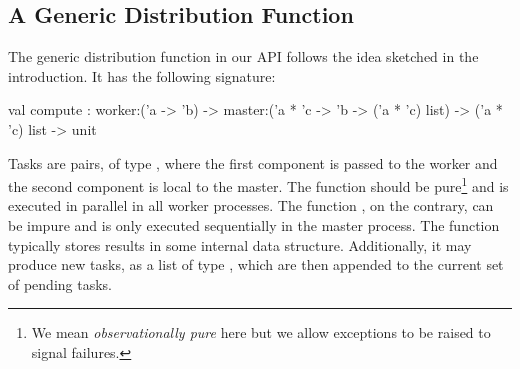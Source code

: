 \documentclass{llncs}
\begin{document}
\subsection{A Generic Distribution Function}

The generic distribution function in our API follows the idea
sketched in the introduction. It has the following signature:
\begin{ocaml}
  val compute : 
    worker:('a -> 'b) -> 
    master:('a * 'c -> 'b -> ('a * 'c) list) -> 
    ('a * 'c) list -> unit
\end{ocaml}
Tasks are pairs, of type , where the first component is
passed to the worker and the second component is local to the master.
The  function should be pure\footnote{We mean
  \emph{observationally pure} here but we allow exceptions to be
  raised to signal failures.} 
and is executed in parallel
in all worker processes. The function , on the
contrary, can be impure and is only executed sequentially in the master process.
The  function typically stores results 
in some internal data structure.
Additionally, it may produce new tasks, as a list of type 
, which are then appended to the current set of
pending tasks.

% 
\end{document}
